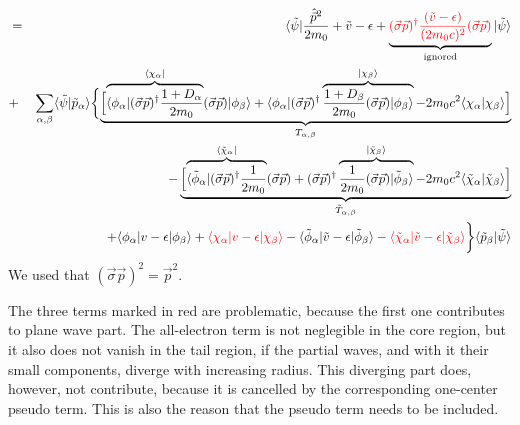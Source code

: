 \documentclass[11pt,a4paper]{report}
\begin{document}
\begin{eqnarray}
\nonumber\\  %
%
&=&\langle\tilde\psi|
\frac{\hat{\vec{p}}^2}{2m_0}+\tilde{v}-\epsilon
+
\underbrace{
\textcolor{red}{(\vec{\sigma}\vec{p})^\dagger
\frac{(\tilde{v}-\epsilon)}{(2m_0c)^2}(\vec{\sigma}\vec{p})}}_{\textrm{ignored}}
|\tilde{\psi}\rangle
\nonumber\\
&+&\sum_{\alpha,\beta}\langle\tilde{\psi}|\tilde{p}_\alpha\rangle
\biggl\lbrace
\underbrace{\Bigl[
\overbrace{
\langle\phi_\alpha|(\vec{\sigma}\vec{p})^\dagger
\frac{1+D_\alpha}{2m_0}
}^{\langle\chi_\alpha|}
(\vec{\sigma}\vec{p})|\phi_\beta\rangle
+\langle\phi_\alpha|
(\vec{\sigma}\vec{p})^\dagger
\overbrace{\frac{1+D_\beta}{2m_0}(\vec{\sigma}\vec{p})
|\phi_\beta\rangle}^{|\chi_\beta\rangle}
-2m_0c^2\langle\chi_\alpha|\chi_\beta\rangle\Bigr]}_{T_{\alpha,\beta}}
\nonumber\\
%
&&\hspace{1.5cm}
-\underbrace{\Bigl[
\overbrace{\langle\tilde{\phi}_\alpha|
(\vec{\sigma}\vec{p})^\dagger\frac{1}{2m_0}
}^{\langle\tilde{\chi}_\alpha|}(\vec{\sigma}\vec{p})
+(\vec{\sigma}\vec{p})^\dagger
\overbrace{
\frac{1}{2m_0}(\vec{\sigma}\vec{p})
|\tilde{\phi}_\beta\rangle}^{|\tilde{\chi}_\beta\rangle}
-2m_0c^2\langle\tilde{\chi}_\alpha
|\tilde{\chi}_\beta\rangle\Bigr]}_{\tilde{T}_{\alpha,\beta}}
\nonumber\\
&&\hspace{1.5cm}+\langle\phi_\alpha|v-\epsilon|\phi_\beta\rangle
+\textcolor{red}{\langle\chi_\alpha|v-\epsilon|\chi_\beta\rangle}
-\langle\tilde{\phi}_\alpha|
\tilde{v}-\epsilon|\tilde{\phi}_\beta\rangle
-
\textcolor{red}{
\langle\tilde{\chi}_\alpha|\tilde{v}-\epsilon|\tilde{\chi}_\beta\rangle}
\biggr\rbrace\langle
\tilde{p}_\beta|\tilde{\psi}\rangle
\nonumber\\
\end{eqnarray}
We used that $(\vec{\sigma}\vec{p})^2=\vec{p}^2$.

The three terms marked in red are problematic, because
the first one contributes to plane wave part. The all-electron term is
not neglegible in the core region, but it also does not vanish in the
tail region, if the partial waves, and with it their small components,
diverge with increasing radius. This diverging part does, however, not
contribute, because it is cancelled by the corresponding one-center
pseudo term. This is also the reason that the pseudo term needs to be
included.
\end{document}
